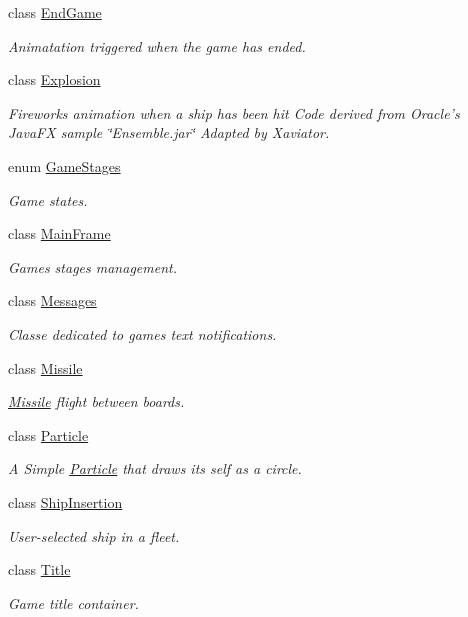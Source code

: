 \begin{DoxyCompactItemize}
class \hyperlink{classbattleship2D_1_1ui_1_1EndGame}{End\-Game}
\begin{DoxyCompactList}\small\item\em Animatation triggered when the game has ended. \end{DoxyCompactList}\item 
class \hyperlink{classbattleship2D_1_1ui_1_1Explosion}{Explosion}
\begin{DoxyCompactList}\small\item\em Fireworks animation when a ship has been hit Code derived from Oracle's Java\-F\-X sample \char`\"{}\-Ensemble.\-jar\char`\"{} Adapted by Xaviator. \end{DoxyCompactList}\item 
enum \hyperlink{enumbattleship2D_1_1ui_1_1GameStages}{Game\-Stages}
\begin{DoxyCompactList}\small\item\em Game states. \end{DoxyCompactList}\item 
class \hyperlink{classbattleship2D_1_1ui_1_1MainFrame}{Main\-Frame}
\begin{DoxyCompactList}\small\item\em Games stages management. \end{DoxyCompactList}\item 
class \hyperlink{classbattleship2D_1_1ui_1_1Messages}{Messages}
\begin{DoxyCompactList}\small\item\em Classe dedicated to games text notifications. \end{DoxyCompactList}\item 
class \hyperlink{classbattleship2D_1_1ui_1_1Missile}{Missile}
\begin{DoxyCompactList}\small\item\em \hyperlink{classbattleship2D_1_1ui_1_1Missile}{Missile} flight between boards. \end{DoxyCompactList}\item 
class \hyperlink{classbattleship2D_1_1ui_1_1Particle}{Particle}
\begin{DoxyCompactList}\small\item\em A Simple \hyperlink{classbattleship2D_1_1ui_1_1Particle}{Particle} that draws its self as a circle. \end{DoxyCompactList}\item 
class \hyperlink{classbattleship2D_1_1ui_1_1ShipInsertion}{Ship\-Insertion}
\begin{DoxyCompactList}\small\item\em User-\/selected ship in a fleet. \end{DoxyCompactList}\item 
class \hyperlink{classbattleship2D_1_1ui_1_1Title}{Title}
\begin{DoxyCompactList}\small\item\em Game title container. \end{DoxyCompactList}\end{DoxyCompactItemize}
